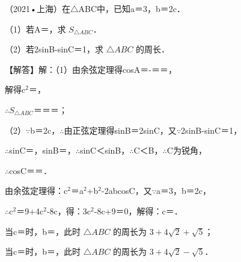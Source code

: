 \begin{question}
（2021•上海）在$\triangle$ABC中，已知a＝3，b＝2c．\par
（1）若A＝\allowbreak{}，求 $S_{\triangle ABC}$．\par
（2）若2sinB-sinC＝1，求 $\triangle ABC$ 的周长．\par
\begin{solution}
【解答】解：（1）由余弦定理得cosA＝-\allowbreak{}＝\allowbreak{}＝\allowbreak{}，\par
解得c$^{2}$＝\allowbreak{}，\par
$\therefore S_{\triangle ABC}$＝\allowbreak{}＝\allowbreak{}＝\allowbreak{}；\par
（2）$\because$b＝2c，$\therefore$由正弦定理得sinB＝2sinC，又$\because$2sinB-sinC＝1，\par
$\therefore$sinC＝\allowbreak{}，sinB＝\allowbreak{}，$\therefore$sinC＜sinB，$\therefore$C＜B，$\therefore$C为锐角，\par
$\therefore$cosC＝\allowbreak{}＝\allowbreak{}．\par
由余弦定理得：c$^{2}$＝a$^{2}$+b$^{2}$-2abcosC，又$\because$a＝3，b＝2c，\par
$\therefore$c$^{2}$＝9+4c$^{2}$-8\allowbreak{}c，得：3c$^{2}$-8\allowbreak{}c+9＝0，解得：c＝\allowbreak{}．\par
当c＝\allowbreak{}时，b＝\allowbreak{}，此时 $\triangle ABC$ 的周长为 $3+4\sqrt2+\sqrt5$；\par
当c＝\allowbreak{}时，b＝\allowbreak{}，此时 $\triangle ABC$ 的周长为 $3+4\sqrt2-\sqrt5$．\par
\end{solution}
\end{question}

